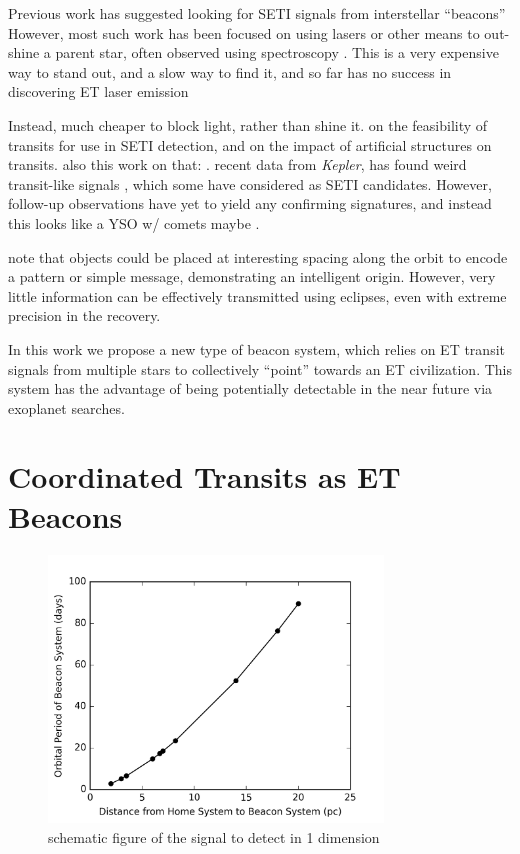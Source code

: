 \documentclass[iop]{emulateapj}
\newcommand{\Kepler}{\textsl{Kepler}\xspace}
\begin{document}
Previous work has suggested looking for SETI signals from interstellar ``beacons''
\cite{benford2008}
However, most such work has been focused on using lasers or other means to out-shine a parent star, often observed using spectroscopy \cite{reines2002}. This is a very expensive way to stand out, and a slow way to find it, and so far has no success in discovering ET laser emission \cite{tellis2015}


Instead, much cheaper to block light, rather than shine it.
\cite{arnold2005}
on the feasibility of transits for use in SETI detection, and 
\cite{arnold2005a}
on the impact of artificial structures on transits. also this work on that:
\cite{wright2016}.
recent data from \Kepler \citep{borucki2010}, has found weird transit-like signals
\cite{boyajian2015}, 
which some have considered as SETI candidates. However, follow-up observations have yet to yield any confirming signatures, and instead this looks like a YSO w/ comets maybe \citep{lisse2015}.


\cite{arnold2005} note that objects could be placed at interesting spacing along the orbit to encode a pattern or simple message, demonstrating an intelligent origin. However, very little information can be effectively transmitted using eclipses, even with extreme precision in the recovery.


In this work we propose a new type of beacon system, which relies on ET transit signals from multiple stars to collectively ``point'' towards an ET civilization. This system has the advantage of being potentially detectable in the near future via exoplanet searches.




\section{Coordinated Transits as ET Beacons}



\begin{figure}[]
\centering
\includegraphics[width=3.5in]{../figures/dist_per.png}
\caption{schematic figure of the signal to detect in 1 dimension}
\label{fig:1d}
\end{figure}
\end{document}
